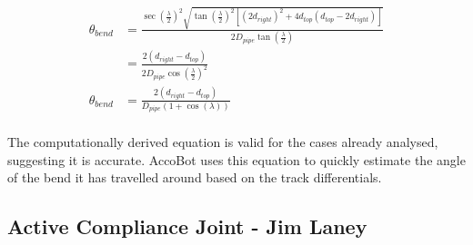 \documentclass[11pt]{article}		%
\begin{document}
			\begin{align*}
				\theta_{bend} &= \frac{ \sec \left( \frac{\lambda}{2} \right)^2 \sqrt{ \tan \left( \frac{\lambda}{2} \right)^2 \left[ \left( 2 d_{right} \right)^2 + 4 d_{top} \left( d_{top} - 2 d_{right} \right) \right] } }{2 D_{pipe} \tan \left( \frac{\lambda}{2} \right)}
				\\
				&= \frac{2 \left( d_{right} - d_{top} \right)}{2 D_{pipe} \cos \left( \frac{\lambda}{2} \right)^2}
				\\
				\theta_{bend} &= \frac{2 \left( d_{right} - d_{top} \right)}{D_{pipe} \left( 1 + \cos \left( \lambda \right) \right)}
			\end{align*}
			\\
	        \hspace*{2ex}The computationally derived equation is valid for the cases already analysed, suggesting it is accurate.
			AccoBot uses this equation to quickly estimate the angle of the bend it has travelled around based on the track differentials.
		 		
		\subsection[Active Compliance Joint]{Active Compliance Joint - Jim Laney} \label{complianceControl}
		
\end{document}

